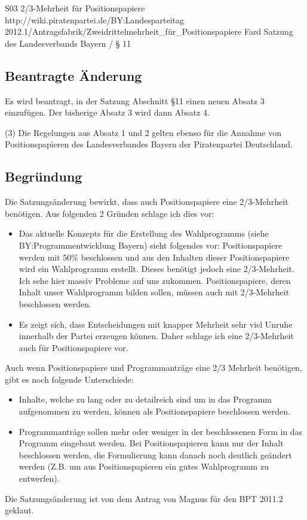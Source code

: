 \anderungsantrag
{S03}
{2/3-Mehrheit für Positionspapiere}
{http://wiki.piratenpartei.de/BY:Landesparteitag 2012.1/Antragsfabrik/Zweidrittelmehrheit_für_Positionspapiere}
{Fard}
{Satzung des Landesverbands Bayern / § 11}
\subsection{Beantragte Änderung}
Es wird beantragt, in der Satzung Abschnitt §11 einen neuen Absatz 3 einzufügen. Der bisherige
Absatz 3 wird dann Absatz 4.\par
(3) Die Regelungen aus Absatz 1 und 2 gelten ebenso für die Annahme von Positionspapieren des
Landesverbandes Bayern der Piratenpartei Deutschland.
\subsection{Begründung}
Die Satzungsänderung bewirkt, dass auch Positionspapiere eine 2/3-Mehrheit benötigen.
Aus folgenden 2 Gründen schlage ich dies vor:
\begin{itemize}
	\item Das aktuelle Konzepts für die Erstellung des Wahlprogramms (siehe BY:Programmentwicklung Bayern) sieht folgendes vor: Positionspapiere werden mit 50\% beschlossen und aus den Inhalten dieser Positionspapiere wird ein Wahlprogramm erstellt. Dieses benötigt jedoch eine 2/3-Mehrheit. Ich sehe hier massiv Probleme auf uns zukommen. Positionspapiere, deren Inhalt unser Wahlprogramm bilden sollen, müssen auch mit 2/3-Mehrheit beschlossen werden.
	\item Es zeigt sich, dass Entscheidungen mit knapper Mehrheit sehr viel Unruhe innerhalb der Partei erzeugen können. Daher schlage ich eine 2/3-Mehrheit auch für Positionspapiere vor.
\end{itemize}

Auch wenn Positionspapiere und Programmanträge eine 2/3 Mehrheit benötigen, gibt es noch
folgende Unterschiede:
\begin{itemize}
	\item Inhalte, welche zu lang oder zu detailreich sind um in das Programm aufgenommen zu werden, können als Positionspapiere beschlossen werden.
	\item Programmanträge sollen mehr oder weniger in der beschlossenen Form in das Programm eingebaut werden. Bei Positionspapieren kann nur der Inhalt beschlossen werden, die Formulierung kann danach noch deutlich geändert werden (Z.B. um aus Positionspapieren ein gutes Wahlprogramm zu entwerfen).
\end{itemize}
Die Satzungsänderung ist von dem Antrag von Magnus für den BPT 2011.2 geklaut.
